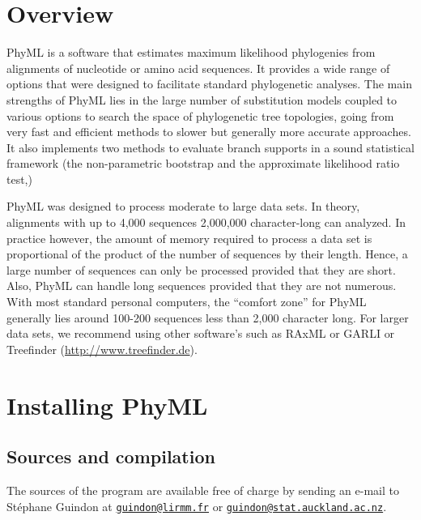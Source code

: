 \documentclass[a4paper,12pt]{article}
\newcommand{\x}[1]{\texttt{#1}}
\begin{document}
\section{Overview}

PhyML \cite{guindon03} is  a software that estimates maximum  likelihood phylogenies from alignments
of nucleotide or  amino acid sequences.  It provides  a wide range of options that  were designed to
facilitate standard phylogenetic analyses.  The main strengths  of PhyML lies in the large number of
substitution models coupled to various options  to search the space of phylogenetic tree topologies,
going from  very fast and efficient  methods to slower  but generally more accurate  approaches.  It
also  implements two  methods to  evaluate branch  supports in  a sound  statistical  framework (the
non-parametric bootstrap and the approximate likelihood ratio test,)

PhyML was designed to  process moderate to large data sets.  In theory,  alignments with up to 4,000
sequences 2,000,000 character-long can analyzed.  In practice however, the amount of memory required
to process  a data set is proportional  of the product of  the number of sequences  by their length.
Hence, a large number  of sequences can only be processed provided that  they are short. Also, PhyML
can  handle long  sequences  provided  that they  are  not numerous.   With  most standard  personal
computers, the  ``comfort zone'' for PhyML generally  lies around 100-200 sequences  less than 2,000
character  long.   For  larger  data  sets,  we  recommend using  other  software's  such  as  RAxML
\cite{raxml}      or       GARLI      \cite{garli}      or      Treefinder
(\href{http://www.treefinder.de}{http://www.treefinder.de}).


\section{Installing PhyML}

\subsection{Sources and compilation}

The sources of the  program are available free of charge by sending  an e-mail to St\'ephane Guindon
at                      \href{mailto:guindon@lirmm.fr}{\x{guindon@lirmm.fr}}                      or
\href{mailto:guindon@stat.auckland.ac.nz}{\x{guindon@stat.auckland.ac.nz}}.
\end{document}
